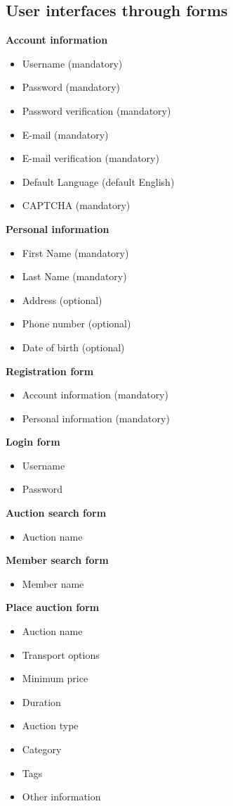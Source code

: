 	\subsection{User interfaces through forms}
	\textbf{Account information}
		\begin{itemize}
			\item Username (mandatory)
			\item Password (mandatory)
			\item Password verification (mandatory)
			\item E-mail (mandatory)
			\item E-mail verification (mandatory)
			\item Default Language (default English)
			\item CAPTCHA (mandatory)
		\end{itemize}
	\textbf{Personal information}
		\begin{itemize}
			\item First Name (mandatory)
			\item Last Name (mandatory)
			\item Address (optional)
			\item Phone number (optional)
			\item Date of birth (optional)
		\end{itemize}
	\textbf{Registration form}
		\begin{itemize}
			\item Account information (mandatory)
			\item Personal information (mandatory)
		\end{itemize}
	\textbf{Login form}
		\begin{itemize}
			\item Username
			\item Password
		\end{itemize}
	\textbf{Auction search form}
		\begin{itemize}
			\item Auction name
		\end{itemize}
	\textbf{Member search form}
		\begin{itemize}
			\item Member name
		\end{itemize}
	\textbf{Place auction form}
		\begin{itemize}
			\item Auction name
			\item Transport options
			\item Minimum price
			\item Duration
			\item Auction type
			\item Category
			\item Tags
			\item Other information
		\end{itemize}
